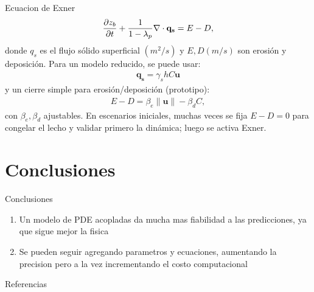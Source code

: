\documentclass{beamer}
\begin{document}
\begin{frame}{Ecuacion de Exner}
    \begin{align}
    {\partial z_b \over \partial t} + \frac{1}{1-\lambda_p} \nabla\cdot \mathbf{q_s} = E-D,
    \end{align}
    donde $q_s$ es el flujo sólido superficial $(m^2/s)$ y $E, D (m/s)$ son erosión y deposición. Para un modelo reducido, se puede usar:
    \begin{align}
        \mathbf{q_s}=\gamma_shC\mathbf{u}
    \end{align}
    y un cierre simple para erosión/deposición (prototipo):
    \begin{align}
        E-D=\beta_e\|\mathbf{u}\|-\beta_dC,
    \end{align}
    con $\beta_e,\beta_d$ ajustables. En escenarios iniciales, muchas veces se fija $E-D = 0$ para congelar el lecho y validar primero la dinámica; 
    luego se activa Exner.
\end{frame}



\section{Conclusiones} %
\begin{frame}{Conclusiones}
    \begin{enumerate}
        \item Un modelo de PDE acopladas da mucha mas fiabilidad a las predicciones, ya que sigue mejor la fisica
        \item Se pueden seguir agregando parametros y ecuaciones, aumentando la precision pero a la vez incrementando el costo computacional
    \end{enumerate}
\end{frame}



\begin{frame}[allowframebreaks]{Referencias}
    \tiny
    
    
\end{frame}
\end{document}
